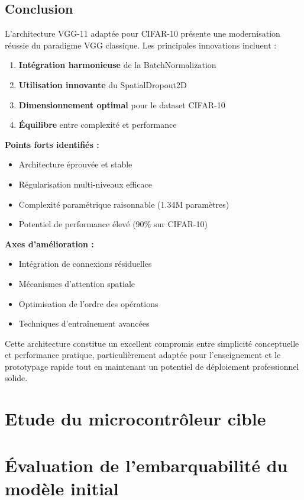 \documentclass[12pt,a4paper]{article}
\begin{document}
\subsection{Conclusion}

L'architecture VGG-11 adaptée pour CIFAR-10 présente une modernisation réussie du paradigme VGG classique. Les principales innovations incluent :

\begin{enumerate}
    \item \textbf{Intégration harmonieuse} de la BatchNormalization
    \item \textbf{Utilisation innovante} du SpatialDropout2D
    \item \textbf{Dimensionnement optimal} pour le dataset CIFAR-10
    \item \textbf{Équilibre} entre complexité et performance
\end{enumerate}

\textbf{Points forts identifiés :}
\begin{itemize}
    \item Architecture éprouvée et stable
    \item Régularisation multi-niveaux efficace
    \item Complexité paramétrique raisonnable (1.34M paramètres)
    \item Potentiel de performance élevé (90\% sur CIFAR-10)
\end{itemize}

\textbf{Axes d'amélioration :}
\begin{itemize}
    \item Intégration de connexions résiduelles
    \item Mécanismes d'attention spatiale
    \item Optimisation de l'ordre des opérations
    \item Techniques d'entraînement avancées
\end{itemize}

Cette architecture constitue un excellent compromis entre simplicité conceptuelle et performance pratique, particulièrement adaptée pour l'enseignement et le prototypage rapide tout en maintenant un potentiel de déploiement professionnel solide.

\section{ Etude du microcontrôleur cible
}
\section{Évaluation de l’embarquabilité du modèle initial}
\end{document}
